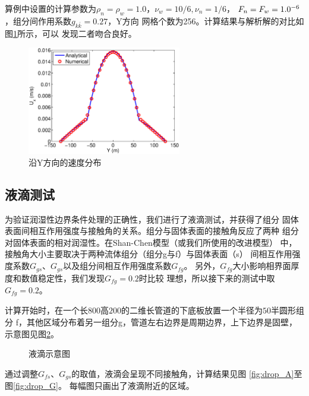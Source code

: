 算例中设置的计算参数为$\rho_n=\rho_w=1.0$，$\nu_w=10/6,\nu_n=1/6$，
$F_n=F_w=1.0\time10^{-6}$，组分间作用系数$g_{k\bar k}=0.27$，Y方向
网格个数为256。计算结果与解析解的对比如图\ref{fig:lcf_vx_a}所示，可以
发现二者吻合良好。
\begin{figure}[htb]
  \centering
  \includegraphics[width=0.6\textwidth]{img/lcf_vx_a}
  \caption{沿Y方向的速度分布}
  \label{fig:lcf_vx_a}
\end{figure}

\subsection{液滴测试}
为验证润湿性边界条件处理的正确性，我们进行了液滴测试，并获得了组分
固体表面间相互作用强度与接触角的关系。组分与固体表面的接触角反应了两种
组分对固体表面的相对润湿性。在Shan-Chen模型（或我们所使用的改进模型）
中，接触角大小主要取决于两种流体组分（组分g与f）与固体表面（s）
间相互作用强度系数$G_{gs}$、$G_{gs}$以及组分间相互作用强度系数$G_{fg}$。
另外，$G_{fg}$大小影响相界面厚度和数值稳定性，我们发现$G_{fg}=0.2$时比较
理想，所以接下来的测试中取$G_{fg}=0.2$。

计算开始时，在一个长$800$高$200$的二维长管道的下底板放置一个半径为$50$半圆形组分
f，其他区域分布着另一组分g，管道左右边界是周期边界，上下边界是固壁，
示意图见图\ref{fig:droplet}。

\begin{figure}[htb]
  \centering
  \caption{液滴示意图}
  \label{fig:droplet}
\end{figure}
通过调整$G_{fs}$、$G_{gs}$的取值，液滴会呈现不同接触角，计算结果见图
\ref{fig:drop_A}至图\ref{fig:drop_G}。
每幅图只画出了液滴附近的区域。

